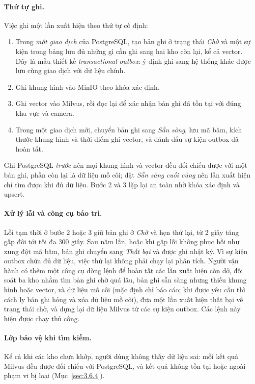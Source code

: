 \paragraph{Thứ tự ghi.} Việc ghi một lần xuất hiện theo thứ tự cố định:
\begin{enumerate}
    \item Trong \emph{một giao dịch} của PostgreSQL, tạo bản ghi ở trạng thái \emph{Chờ} và một sự kiện trong bảng  lưu đủ những gì cần ghi sang hai kho còn lại, kể cả vector. Đây là mẫu thiết kế \emph{transactional outbox}: ý định ghi sang hệ thống khác được lưu cùng giao dịch với dữ liệu chính.
    \item Ghi khung hình vào MinIO theo khóa xác định.
    \item Ghi vector vào Milvus, rồi đọc lại để xác nhận bản ghi đã tồn tại với đúng khu vực và camera.
    \item Trong một giao dịch mới, chuyển bản ghi sang \emph{Sẵn sàng}, lưu mã băm, kích thước khung hình và thời điểm ghi vector, và đánh dấu sự kiện outbox đã hoàn tất.
\end{enumerate}
Ghi PostgreSQL \emph{trước} nên mọi khung hình và vector đều đối chiếu được với một bản ghi, phần còn lại là dữ liệu mồ côi; đặt \emph{Sẵn sàng} \emph{cuối cùng} nên lần xuất hiện chỉ tìm được khi đủ dữ liệu. Bước 2 và 3 lặp lại an toàn nhờ khóa xác định và upsert.

\paragraph{Xử lý lỗi và công cụ bảo trì.} Lỗi tạm thời ở bước 2 hoặc 3 giữ bản ghi ở \emph{Chờ} và hẹn thử lại, từ 2 giây tăng gấp đôi tới tối đa 300 giây. Sau năm lần, hoặc khi gặp lỗi không phục hồi như xung đột mã băm, bản ghi chuyển sang \emph{Thất bại} và được ghi nhật ký. Vì sự kiện outbox chứa đủ dữ liệu, việc thử lại không phải chạy lại phân tích. Người vận hành có thêm một công cụ dòng lệnh để hoàn tất các lần xuất hiện còn dở, đối soát ba kho nhằm tìm bản ghi chờ quá lâu, bản ghi sẵn sàng nhưng thiếu khung hình hoặc vector, và dữ liệu mồ côi (mặc định chỉ báo cáo; khi được yêu cầu thì cách ly bản ghi hỏng và xóa dữ liệu mồ côi), đưa một lần xuất hiện thất bại về trạng thái chờ, và dựng lại dữ liệu Milvus từ các sự kiện outbox. Các lệnh này hiện được chạy thủ công.

\paragraph{Lớp bảo vệ khi tìm kiếm.} Kể cả khi các kho chưa khớp, người dùng không thấy dữ liệu sai: mỗi kết quả Milvus đều được đối chiếu với PostgreSQL, và kết quả không tồn tại hoặc ngoài phạm vi bị loại (Mục~\ref{sec:3.6.4}).
